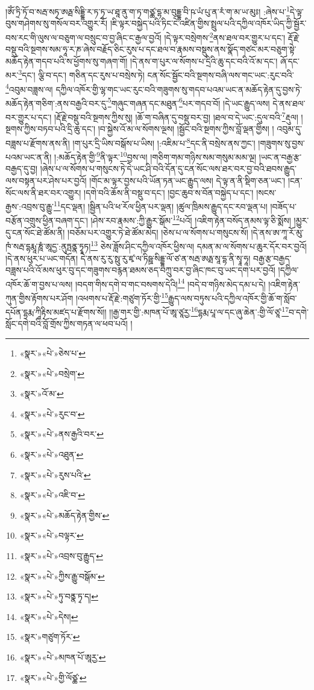 །ཨོཾ་ཏྲི་ཏོ་བ་སརྦ་སཏྭ་ཨརྠ་སིདྡྷི་ར་ཏ་ཏྭ་ཡ་ཐཱ་ནུ་ག་ཏ་གཙྪ་དྷ་མ་བུདྡྷ་བི་ཥ་ཡཾ་པུ་ན་རཾ་ག་མ་ཡ་མུཿ། :ཞེས་པ་\footnote{«སྣར་»«པེ་»ཅེས་པ་}དེ་ལྟ་བུས་གཤེགས་སུ་གསོལ་བར་འགྱུར་རོ། །ཇི་ལྟར་བསྐྱེད་པའི་ཏིང་ངེ་འཛིན་གྱིས་སྤྲུལ་པའི་དཀྱིལ་འཁོར་ཡིད་ཀྱི་སྦྱོར་བས་རང་གི་ལུས་ལ་བཅུག་ལ་བསྲུང་བ་བྱ་ཞིང་ང་རྒྱལ་བྱའོ། །དེ་ལྟར་བསྲེགས་\footnote{«སྣར་»«པེ་»བསྲེག་}ནས་ཐལ་བར་གྱུར་པ་དང་། རྡོ་རྗེ་བསྡུ་བའི་སྔགས་སམ་ཧཱ་ར་ཎ་ཞེས་བརྗོད་ཅིང་རུས་པ་དང་ཐལ་བ་རྣམས་བསྡུས་ནས་སྣོད་གཙང་མར་བཅུག་སྟེ་མཆོད་རྟེན་གདབ་པའི་ས་ཕྱོགས་སུ་གཞག་གོ། །དེ་ནས་ག་པུར་ལ་སོགས་པ་དྲིའི་ཆུ་དང་བའི་འོ་མ་དང་། ཞོ་དང་མར་\footnote{«སྣར་»འོ་མ་}དང་། ལྕི་བ་དང་། གཅིན་དང་རུས་པ་བསྲེས་ཏེ། ངན་སོང་སྦྱོང་བའི་སྔགས་བཞི་ལས་གང་ཡང་:རུང་བའི་\footnote{«སྣར་»«པེ་»རུང་བ་}འབུམ་བཟླས་ལ། དཀྱིལ་འཁོར་གྱི་ལྷ་གང་ཡང་རུང་བའི་གཟུགས་སུ་གདབ་པའམ་ཡང་ན་མཆོད་རྟེན་དུ་བྱས་ཏེ་མཆོད་རྟེན་གཅིག་:ནས་བརྒྱའི་བར་དུ་\footnote{«སྣར་»«པེ་»ནས་རྒྱའི་བར་}གཞུང་གཞན་དང་མཐུན་\footnote{«སྣར་»«པེ་»འཐུན་}པར་གདབ་བོ། །དེ་ཡང་རྒྱུད་ལས། དེ་ནས་ཐལ་བར་གྱུར་པ་དང་། །རྡོ་རྗེ་བསྡུ་བའི་སྔགས་ཀྱིས་སུ། །ཆོ་ག་བཞིན་དུ་བསྡུ་བར་བྱ། །ཐལ་བ་དེ་ཡང་:དུལ་བའི་\footnote{«སྣར་»«པེ་»རུས་པའི་}རྡུལ། །སྔགས་ཀྱིས་བཏབ་པའི་དྲི་ཆུ་དང་། །བ་སྐྱེས་འོ་མ་ལ་སོགས་ལྔས། །སྦྱོང་བའི་སྔགས་ཀྱིས་བློ་ལྡན་གྱིས། །
འབུམ་དུ་བཟླས་པ་རྫོགས་ནས་ནི། །ག་པུར་དྲི་ཡིས་བསྒོས་པ་ཡིས། །:འཇིམ་པ་\footnote{«སྣར་»«པེ་»འཇི་བ་}དང་ནི་བསྲེས་ནས་ཀྱང་། །གཟུགས་སུ་བྱས་པའམ་ཡང་ན་ནི། །:མཆོད་རྟེན་གྱི་\footnote{«སྣར་»«པེ་»མཆོད་རྟེན་གྱིས་}ནི་ལྟར་\footnote{«སྣར་»«པེ་»བལྟར་}བྱས་ལ། །གཅིག་གམ་གཉིས་སམ་གསུམ་མམ་ལྔ། །ཡང་ན་བརྒྱ་རྩ་བརྒྱད་དུ་བྱ། །ཞེས་པ་ལ་སོགས་པ་གསུངས་ཏེ་དེ་ཡང་ཤི་བའི་དོན་དུ་ངན་སོང་ལས་ཐར་བར་བྱ་བའི་ཐབས་རྒྱུད་ལས་བསྟན་པར་ཤེས་པར་བྱའོ། །གོང་མ་ལྟར་བྱས་པའི་ཡོན་ཏན་ཡང་རྒྱུད་ལས། དེ་ལྟ་ན་ནི་སྡིག་ཅན་ཡང་། །ངན་སོང་ལས་ནི་ཐར་བར་འགྱུར། །དགེ་བའི་ཆོས་ནི་བསྡུ་བ་དང་། །བྱང་ཆུབ་ས་བོན་བསྐྱེད་པ་དང་། །སངས་རྒྱས་:འབྲས་བུ་རྒྱུ་\footnote{«སྣར་»«པེ་»འབྲས་བུ་རྒྱུད་}དང་ལྡན། །སྦྱིན་པའི་ཕ་རོལ་ཕྱིན་པར་ལྡན། །ཚུལ་ཁྲིམས་རྒྱུད་དང་རབ་ལྡན་པ། །བཟོད་པ་བརྩོན་འགྲུས་ཕྱིན་བཞག་དང་། །ཤེས་རབ་རྣམས་:ཀྱི་རྒྱུར་སྒོམ་\footnote{«སྣར་»«པེ་»ཀྱིས་རྒྱུ་བསྒོམ་}པའོ། །འཇིག་རྟེན་བསོད་ནམས་ལྟ་ཅི་སྨོས། །མྱུར་དུ་ངན་སོང་ཐེ་ཚོམ་ནི། །བཅོམ་པར་འགྱུར་ཏེ་ཐེ་ཚོམ་མེད། །ཅེས་པ་ལ་སོགས་པ་གསུངས་སོ། །དེ་ནས་ཨ་ཀཱ་རོ་མུ་ཁཾ་སརྦ་དྷརྨཱ་ཎཱཾ་ཨཱདྱ་:ནུཏྤནྣ་ཏྭཱཏ།\footnote{«སྣར་»«པེ་»ཏུ་བནྣ་ཏྭ་ད།} ཅེས་ཟློས་ཤིང་དཀྱིལ་འཁོར་ཕྱིས་ལ། དམན་མ་ལ་སོགས་པ་ཆུར་དོར་བར་བྱའོ། །དེ་ནས་ཕུར་པ་ཡང་གདོན། དེ་ནས་རུ་རུ་སྥུ་རུ་ཛྭ་ལ་ཏིཥྛ་སིདྡྷ་ལོ་ཙ་ན་སརྦ་ཨརྠ་སཱ་དྷ་ནི་སྭཱ་ཧཱ། བརྒྱ་རྩ་བརྒྱད་བཟླས་པའི་འོ་མས་ཕུར་བུ་དང་གཟུགས་བརྙན་ཐམས་ཅད་བཀྲུ་བར་བྱ་ཞིང་ཁང་བུ་ཡང་དག་པར་བྱའོ། །དཀྱིལ་འཁོར་ཆོ་ག་བྱས་པ་ལས། །བདག་གིས་དགེ་བ་གང་བསགས་དེའི།\footnote{«སྣར་»«པེ་»དེས།} །བདེ་བ་གཉིས་མེད་དམ་པ་དེ། །འཇིག་རྟེན་ཀུན་གྱིས་རྟོགས་པར་ཤོག །འཕགས་པ་རྡོ་རྗེ་:གཙུག་ཏོར་གྱི་\footnote{«སྣར་»གཙུག་ཏོར་}རྒྱུད་ལས་བཏུས་པའི་དཀྱིལ་འཁོར་གྱི་ཆོ་ག་སློབ་དཔོན་དྷརྨ་ཀཱིརྟིས་མཛད་པ་རྫོགས་སོ།། །།རྒྱ་གར་གྱི་:མཁན་པོ་ཨཱ་ཙཱརྱ་\footnote{«སྣར་»«པེ་»མཁན་པོ་ཨཱརྱ་}དྷརྨ་པཱ་ལ་དང་ཞུ་ཆེན་:གྱི་ལོ་ཙཱ་\footnote{«སྣར་»«པེ་»གྱི་ལོཙྪ་}བ་དགེ་སློང་དགེ་བའི་བློ་གྲོས་ཀྱིས་གཏན་ལ་ཕབ་པའོ། ། 